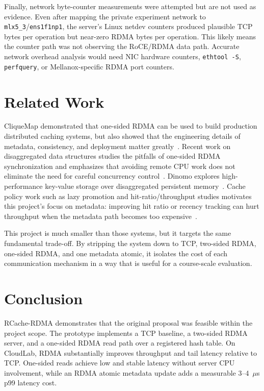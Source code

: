 \documentclass[letterpaper,twocolumn,10pt]{article}
\newcommand{\sys}{RCache-RDMA}
\begin{document}
Finally, network byte-counter measurements were attempted but are not used as
evidence.  Even after mapping the private experiment network to
\texttt{mlx5\_3}/\texttt{ens1f1np1}, the server's Linux netdev counters
produced plausible TCP bytes per operation but near-zero RDMA bytes per
operation.  This likely means the counter path was not observing the
RoCE/RDMA data path.  Accurate network overhead analysis would need NIC
hardware counters, \texttt{ethtool -S}, \texttt{perfquery}, or
Mellanox-specific RDMA port counters.

\section{Related Work}

CliqueMap demonstrated that one-sided RDMA can be used to build production
distributed caching systems, but also showed that the engineering details of
metadata, consistency, and deployment matter greatly~\cite{singhvi21cliquemap}.
Recent work on disaggregated data structures studies the pitfalls of
one-sided RDMA synchronization and emphasizes that avoiding remote CPU work
does not eliminate the need for careful concurrency control~\cite{jasny25rdma}.
Dinomo explores high-performance key-value storage over disaggregated
persistent memory~\cite{lee22dinomo}.  Cache policy work such as lazy
promotion and hit-ratio/throughput studies motivates this project's focus on
metadata: improving hit ratio or recency tracking can hurt throughput when the
metadata path becomes too expensive~\cite{chenLazyPromotion,qiu24hitratio}.

This project is much smaller than those systems, but it targets the same
fundamental trade-off.  By stripping the system down to TCP, two-sided RDMA,
one-sided RDMA, and one metadata atomic, it isolates the cost of each
communication mechanism in a way that is useful for a course-scale evaluation.

\section{Conclusion}

\sys{} demonstrates that the original proposal was feasible within the project
scope.  The prototype implements a TCP baseline, a two-sided RDMA server, and
a one-sided RDMA read path over a registered hash table.  On CloudLab, RDMA
substantially improves throughput and tail latency relative to TCP.  One-sided
reads achieve low and stable latency without server CPU involvement, while an
RDMA atomic metadata update adds a measurable 3--4~$\mu$s p99 latency cost.
\end{document}
